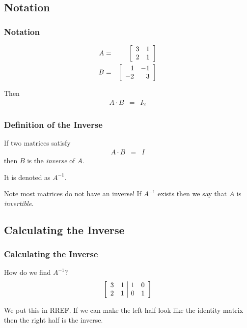 \subsection{Notation}

\begin{frame}
  \frametitle{Notation}

  \begin{eqnarray*}
    A & = & \left[ \begin{array}{rr} 3 & 1 \\ 2 & 1 \end{array} \right] \\
    B & = & \left[ \begin{array}{rr} 1 & -1 \\ -2 & 3 \end{array} \right] 
  \end{eqnarray*}

  Then
  \begin{eqnarray*}
    A\cdot B & = & I_2
  \end{eqnarray*}

\end{frame}


\begin{frame}
  \frametitle{Definition of the Inverse}

  If two matrices satisfy
  \begin{eqnarray*}
    A\cdot B & = & I
  \end{eqnarray*}
  then $B$ is the \textit{inverse} of $A$.

  It is denoted as $A^{-1}$.

  Note most matrices do not have an inverse! If $A^{-1}$ exists then
  we say that $A$ is \textit{invertible}.

\end{frame}

\subsection{Calculating the Inverse}

\begin{frame}
  \frametitle{Calculating the Inverse}

  How do we find $A^{-1}$?
  \begin{eqnarray*}
    \left[ \begin{array}{rr|rr}
    3 & 1 & 1 & 0 \\ 
    2 & 1 & 0 & 1 \\ 
    \end{array} \right]
  \end{eqnarray*}

  We put this in RREF. If we can make the left half look like the
  identity matrix then the right half is the inverse.

\end{frame}


